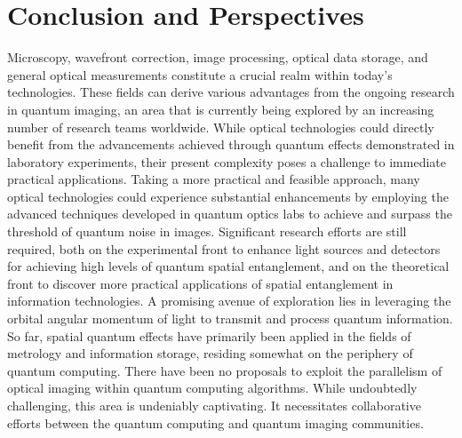 \documentclass{article}
\begin{document}
\section{Conclusion and Perspectives}
Microscopy, wavefront correction, image processing, optical data storage, and general optical measurements constitute a crucial realm within today's technologies. These fields can derive various advantages from the ongoing research in quantum imaging, an area that is currently being explored by an increasing number of research teams worldwide.
While optical technologies could directly benefit from the advancements achieved through quantum effects demonstrated in laboratory experiments, their present complexity poses a challenge to immediate practical applications. Taking a more practical and feasible approach, many optical technologies could experience substantial enhancements by employing the advanced techniques developed in quantum optics labs to achieve and surpass the threshold of quantum noise in images.
Significant research efforts are still required, both on the experimental front to enhance light sources and detectors for achieving high levels of quantum spatial entanglement, and on the theoretical front to discover more practical applications of spatial entanglement in information technologies. A promising avenue of exploration lies in leveraging the orbital angular momentum of light to transmit and process quantum information. So far, spatial quantum effects have primarily been applied in the fields of metrology and information storage, residing somewhat on the periphery of quantum computing. There have been no proposals to exploit the parallelism of optical imaging within quantum computing algorithms. While undoubtedly challenging, this area is undeniably captivating. It necessitates collaborative efforts between the quantum computing and quantum imaging communities.
\newpage


\end{document}
